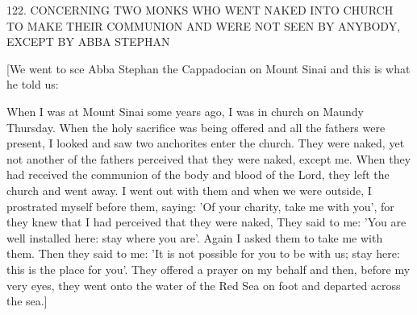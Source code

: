 122.
CONCERNING TWO MONKS
WHO WENT NAKED INTO CHURCH
TO MAKE THEIR COMMUNION AND WERE NOT SEEN BY
ANYBODY, EXCEPT BY ABBA STEPHAN

[We went to sce Abba Stephan the Cappadocian on Mount Sinai
and this is what he told us:

When I was at Mount Sinai some years ago, I was in church on
Maundy Thursday.
When the holy sacrifice was being offered and
all the fathers were present, I looked and saw two anchorites enter
the church.
They were naked, yet not another of the fathers
perceived that they were naked, except me.
When they had received
the communion of the body and blood of the Lord, they left the
church and went away.
I went out with them and when we were
outside, I prostrated myself before them, saying: 'Of your charity,
take me with you', for they knew that I had perceived that they
were naked, They said to me: 'You are well installed here: stay
where you are'.
Again I asked them to take me with them.
Then
they said to me: 'It is not possible for you to be with us; stay here:
this is the place for you'.
They offered a prayer on my behalf and
then, before my very eyes, they went onto the water of the Red Sea
on foot and departed across the sea.]

